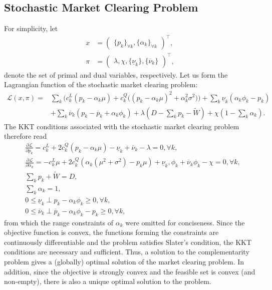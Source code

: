 \documentclass{article}
\begin{document}
\subsection*{Stochastic Market Clearing Problem}
For simplicity, let 
\begin{align*}
x &= \begin{pmatrix} \{p_k\}_{\forall k}, \{\alpha_k\}_{\forall k} \end{pmatrix}^\top,\\
\pi &= \begin{pmatrix} \lambda, \chi, \{\underline{\nu}_k\}, \{\overline{\nu}_k\} \end{pmatrix}^\top,
\end{align*}
denote the set of primal and dual variables, respectively. Let us form the Lagrangian function of the stochastic market clearing problem:
\begin{align*}
\mathcal{L}(x, \pi) =& \sum_k \Big(c_k^L(p_k - \alpha_k \mu) + c_k^Q \big((p_k - \alpha_k \mu)^2 + \alpha_k^2 \sigma^2\big)\Big) + \sum_k \underline{\nu}_k (\alpha_k \phi_k - p_k)\\
& + \sum_k \overline{\nu}_k (p_k - \overline{p}_k + \alpha_k \phi_k) + \lambda(D - \sum_k p_k - \tilde{W}) + \chi(1 - \sum_k \alpha_k).
\end{align*}
The KKT conditions associated with the stochastic market clearing problem therefore read
\begin{align*}
&\frac{\partial \mathcal{L}}{\partial p_k} = c_k^L + 2 c_k^Q (p_k - \alpha_k \mu) - \underline{\nu}_k + \overline{\nu}_k - \lambda = 0, \forall k,\\
&\frac{\partial \mathcal{L}}{\partial \alpha_k} = - c_k^L \mu + 2 c_k^Q(\alpha_k(\mu^2 + \sigma^2) - p_k \mu) + \underline{\nu}_k, \phi_k + \overline{\nu}_k \phi_k  - \chi = 0, \forall k,\\
&\sum_k p_k + \tilde{W} = D,\\
&\sum_k \alpha_k = 1,\\
&0 \le \underline{\nu}_k \perp p_k - \alpha_k \phi_k \ge 0, \forall k,\\
&0 \le \overline{\nu}_k \perp \overline{p}_k -  \alpha_k \phi_k- p_k \ge 0, \forall k,
\end{align*}
from which the range constraints of $\alpha_k$ were omitted for conciseness. Since the objective function is convex, the functions forming the constraints are continuously differentiable and the problem satisfies Slater's condition, the KKT conditions are necessary and sufficient. Thus, a solution to the complementarity problem gives a (globally) optimal solution of the market clearing problem. In addition, since the objective is strongly convex and the feasible set is convex (and non-empty), there is also a unique optimal solution to the problem.
\end{document}
